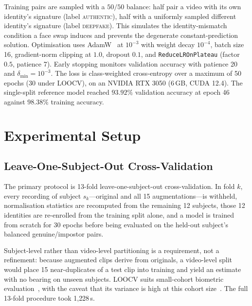\documentclass[conference]{IEEEtran}
\begin{document}
Training pairs are sampled with a $50/50$ balance: half pair a video with its
own identity's signature (label \textsc{authentic}), half with a uniformly
sampled different identity's signature (label \textsc{deepfake}). This
simulates the identity-mismatch condition a face swap induces and prevents the
degenerate constant-prediction solution. Optimisation uses
AdamW~\cite{adamw} at $10^{-3}$ with weight decay $10^{-4}$, batch size 16,
gradient-norm clipping at $1.0$, dropout $0.1$, and
\texttt{ReduceLROnPlateau} (factor $0.5$, patience 7). Early stopping monitors
validation accuracy with patience 20 and $\delta_{\min} = 10^{-3}$. The loss is class-weighted
cross-entropy over a maximum of 50 epochs (30 under LOOCV), on an NVIDIA RTX
3050 (6\,GB, CUDA 12.4). The single-split reference model reached $93.92\%$
validation accuracy at epoch 46 against $98.38\%$ training accuracy.

\section{Experimental Setup}
\label{sec:setup}

\subsection{Leave-One-Subject-Out Cross-Validation}

The primary protocol is 13-fold leave-one-subject-out cross-validation. In fold
$k$, every recording of subject $s_k$---original and all 15
augmentations---is withheld, normalisation statistics are recomputed from the
remaining 12 subjects, those 12 identities are re-enrolled from the training
split alone, and a model is trained from scratch for 30 epochs before being
evaluated on the held-out subject's balanced genuine/impostor pairs.

Subject-level rather than video-level partitioning is a requirement, not a
refinement: because augmented clips derive from originals, a video-level split
would place 15 near-duplicates of a test clip into training and yield an
estimate with no bearing on unseen subjects. LOOCV suits small-cohort biometric
evaluation~\cite{iso19795}, with the caveat that its variance is high at this
cohort size~\cite{varoquaux_small}. The full 13-fold procedure took
1{,}228\,s.
\end{document}
